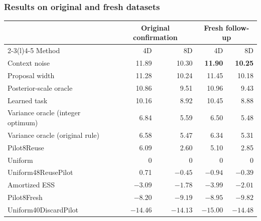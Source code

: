 \documentclass[10pt,letterpaper]{article}
\begin{document}
\subsubsection{Results on original and fresh datasets}
\begin{center}\begin{minipage}{\linewidth}\centering\small
\begin{tabular}{@{}lrrrr@{}}
\toprule
&\multicolumn{2}{c}{Original confirmation}&\multicolumn{2}{c}{Fresh follow-up}\\
\cmidrule(lr){2-3}\cmidrule(l){4-5}
Method & 4D & 8D & 4D & 8D\\
\midrule
Context noise &11.89&10.30&\textbf{11.90}&\textbf{10.25}\\
Proposal width &11.28&10.24&11.45&10.18\\
Posterior-scale oracle &10.86&9.51&10.96&9.43\\
Learned task &10.16&8.92&10.45&8.88\\
Variance oracle (integer optimum)&6.84&5.59&6.50&5.48\\
Variance oracle (original rule)&6.58&5.47&6.34&5.31\\
Pilot8Reuse&6.09&2.60&5.10&2.85\\
Uniform&0&0&0&0\\
Uniform48ReusePilot&0.71&$-0.45$&$-0.94$&$-0.39$\\
Amortized ESS&$-3.09$&$-1.78$&$-3.99$&$-2.01$\\
Pilot8Fresh&$-8.20$&$-9.19$&$-8.95$&$-9.82$\\
Uniform40DiscardPilot&$-14.46$&$-14.13$&$-15.00$&$-14.48$\\
\bottomrule
\end{tabular}
\label{tab:baselines}
\end{minipage}\end{center}
\end{document}
